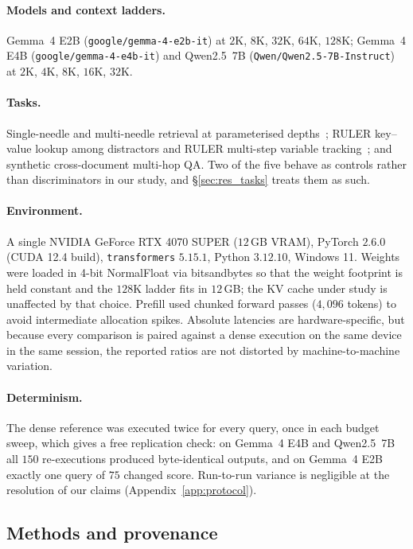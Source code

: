 \documentclass[sigplan,10pt,anonymous,review,nonacm]{acmart}
\begin{document}
\paragraph{Models and context ladders.}
Gemma~4 E2B (\texttt{google/\allowbreak gemma-4-e2b-it}) at $2$K, $8$K,
$32$K, $64$K, $128$K; Gemma~4 E4B (\texttt{google/\allowbreak gemma-4-e4b-it})
and Qwen2.5~7B (\texttt{Qwen/\allowbreak Qwen2.5-7B-Instruct}) at $2$K, $4$K,
$8$K, $16$K, $32$K.

\paragraph{Tasks.}
Single-needle and multi-needle retrieval at parameterised
depths~\cite{kamradt2023needle}; RULER key--value lookup among distractors and
RULER multi-step variable tracking~\cite{hsieh2024ruler}; and synthetic
cross-document multi-hop QA. Two of the five behave as controls rather than
discriminators in our study, and \S\ref{sec:res_tasks} treats them as such.

\paragraph{Environment.}
A single NVIDIA GeForce RTX 4070 SUPER ($12$\,GB VRAM), PyTorch $2.6.0$
(CUDA 12.4 build), \texttt{transformers} $5.15.1$, Python $3.12.10$, Windows
11. Weights were loaded in 4-bit NormalFloat via bitsandbytes so that the
weight footprint is held constant and the $128$K ladder fits in $12$\,GB; the
KV cache under study is unaffected by that choice. Prefill used chunked
forward passes ($4{,}096$ tokens) to avoid intermediate allocation spikes.
Absolute latencies are hardware-specific, but because every comparison is
paired against a dense execution on the same device in the same session, the
reported ratios are not distorted by machine-to-machine variation.

\paragraph{Determinism.}
The dense reference was executed twice for every query, once in each budget
sweep, which gives a free replication check: on Gemma~4 E4B and Qwen2.5~7B all
$150$ re-executions produced byte-identical outputs, and on Gemma~4 E2B
exactly one query of $75$ changed score. Run-to-run variance is negligible at
the resolution of our claims (Appendix~\ref{app:protocol}).

\subsection{Methods and provenance}
\label{sec:provenance}
\end{document}
